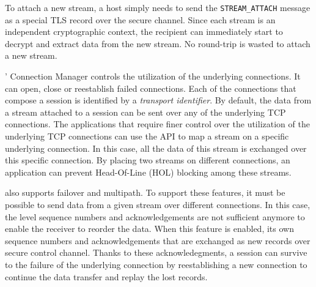 To attach a new stream, a host simply needs to send the \texttt{STREAM\_ATTACH} message as a special TLS record over the secure channel. Since each stream is an independent cryptographic context, the recipient can immediately start to decrypt and extract data from the new stream. No round-trip is wasted to attach a new stream.




\tcpls' Connection Manager controls the utilization of the underlying \tcp connections. It can open, close or reestablish failed \tcp connections. Each of
the connections that compose a \tcpls session is identified by a \emph{transport identifier}. By default, the data from a stream attached to a \tcpls session can be sent over any of the underlying TCP connections. The applications that
require finer control over the utilization of the underlying TCP connections can
use the \tcpls API to map a stream on a specific underlying connection. In this case, all the data of this stream is exchanged over this specific connection.
By placing two streams on different connections, an application can prevent Head-Of-Line (HOL) blocking among these streams. 

\tcpls also supports failover and multipath. To support these features, it
must be possible to send data from a given stream over different \tcp connections. In this case, the \tcp level sequence numbers and acknowledgements are not sufficient anymore to enable the receiver to reorder the data. When this feature
is enabled, \tcpls its own sequence numbers and acknowledgements that are exchanged as new \tls records over secure control channel.
Thanks to these \tcpls acknowledegments, a \tcpls session can survive to
the failure of the underlying \tcp connection by reestablishing a new
\tcp connection to continue the data transfer and replay the lost records.

